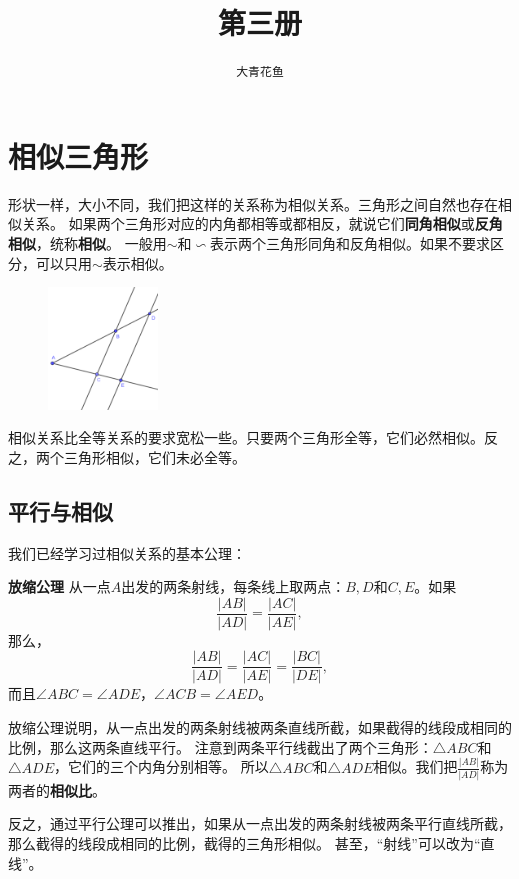 \documentclass[12pt,UTF8]{ctexbook}
\title{\zihao{0} \bfseries 第三册}
\author{\zihao{2} \texttt{大青花鱼}}
\date{}
\begin{document}
\maketitle
\tableofcontents
\newpage

\chapter{相似三角形}
形状一样，大小不同，我们把这样的关系称为相似关系。三角形之间自然也存在相似关系。
如果两个三角形对应的内角都相等或都相反，就说它们\textbf{同角相似}或\textbf{反角相似}，统称\textbf{相似}。
一般用$\sim$和$\backsim$表示两个三角形同角和反角相似。如果不要求区分，可以只用$\sim$表示相似。

\begin{figure} %
    \vspace{40pt}
    \includegraphics[width=0.26\textwidth]{tu/比例1.png}
\end{figure}

相似关系比全等关系的要求宽松一些。只要两个三角形全等，它们必然相似。反之，两个三角形相似，它们未必全等。

\section{平行与相似}
我们已经学习过相似关系的基本公理：
\begin{po}{\textbf{放缩公理}}\label{po:6}
    从一点$A$出发的两条射线，每条线上取两点：$B,D$和$C,E$。如果
    $$ \frac{|AB|}{|AD|} = \frac{|AC|}{|AE|},$$
    那么，
    $$ \frac{|AB|}{|AD|} = \frac{|AC|}{|AE|} = \frac{|BC|}{|DE|},$$
    而且$\angle ABC = \angle ADE$，$\angle ACB = \angle AED$。
\end{po}

放缩公理说明，从一点出发的两条射线被两条直线所截，如果截得的线段成相同的比例，那么这两条直线平行。
注意到两条平行线截出了两个三角形：$\triangle ABC$和$\triangle ADE$，它们的三个内角分别相等。
所以$\triangle ABC$和$\triangle ADE$相似。我们把$\frac{|AB|}{|AD|}$称为两者的\textbf{相似比}。

反之，通过平行公理可以推出，如果从一点出发的两条射线被两条平行直线所截，那么截得的线段成相同的比例，截得的三角形相似。
甚至，“射线”可以改为“直线”。
\end{document}
